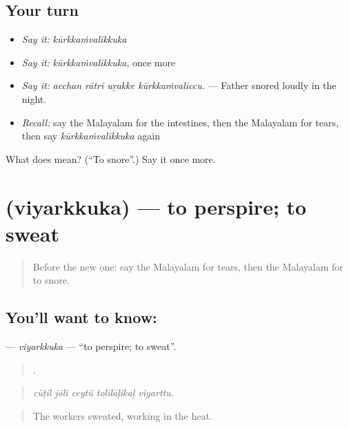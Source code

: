 \subsection*{Your turn}
\begin{itemize}
\raggedright
  \item \emph{Say it:} \emph{kūrkkaṁvalikkuka}
  \item \emph{Say it:} \emph{kūrkkaṁvalikkuka}, once more
  \item \emph{Say it:} \emph{acchan rātri uṟakke kūrkkaṁvaliccu.} — Father snored loudly in the night.
  \item \emph{Recall:} say the Malayalam for the intestines, then the Malayalam for tears, then say \emph{kūrkkaṁvalikkuka} again
\end{itemize}

\begin{tcolorbox}[breakable,colback=teal!4,colframe=teal!35!black,title={Before you move on}]
What does  mean? (\textquotedblleft{}To snore\textquotedblright{}.) Say it once more.
\end{tcolorbox}
\section[\texorpdfstring{\ml{വിയർക്കുക} (viyarkkuka)}{വിയർക്കുക (viyarkkuka)}]{ (viyarkkuka) — to perspire; to sweat}

\label{lesson:ML-C537-viyarkkuka}



\begin{quote}
Before the new one: say the Malayalam for tears, then the Malayalam for to snore.
\end{quote}

\subsection*{You'll want to know: }
\textbf{} — \emph{viyarkkuka} — \textquotedblleft{}to perspire; to sweat\textquotedblright{}.

\begin{quote}
    .
\end{quote}

\begin{quote}
\emph{cūṭil jōli ceytŭ toḻilāḷikaḷ viyarttu.}
\end{quote}

\begin{quote}
The workers sweated, working in the heat.
\end{quote}

